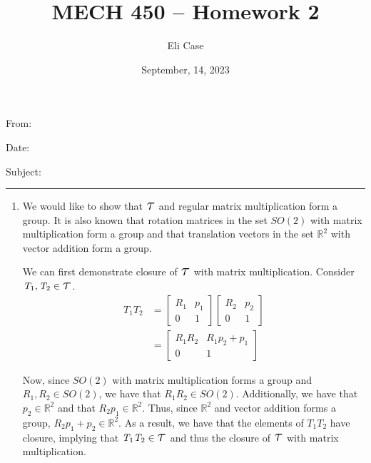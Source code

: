 \documentclass[11pt]{article}
\author{Eli Case}
\title{MECH 450 -- Homework 2}
\date{September, 14, 2023}
\newcommand\Tau{\scalerel*{\tau}{T}}
\begin{document}
\flushleft
\thispagestyle{plain}

From: \@author

Date: \@date

Subject: \@title

\makeatother
\medskip
\hrule
\medskip

\begin{enumerate}[leftmargin=0.3in]

   \item %
   \begin{enumerate}
    We would like to show that $\Tau$ and regular matrix multiplication form a group. It is also known that rotation matrices in the set $\mathit{SO}(2)$ with matrix multiplication form a group and that translation vectors in the set $\mathbb{R}^2$ with vector addition form a group. \break

    We can first demonstrate closure of $\Tau$ with matrix multiplication. Consider $\mathit{T}_1, \mathit{T}_2 \in \Tau$. 
       \begin{align*}
           \mathit{T}_1 \mathit{T}_2 &= \begin{bmatrix}
               \mathit{R}_1 & \mathit{p}_1 \\
               0 & 1
               \end{bmatrix} \begin{bmatrix}
               \mathit{R}_2 & \mathit{p}_2 \\
               0 & 1
           \end{bmatrix} \\
           &= \begin{bmatrix}
              \mathit{R}_1 \mathit{R}_2 & \mathit{R}_1 \mathit{p}_2 + \mathit{p}_1 \\
              0 & 1
          \end{bmatrix}
       \end{align*}

       Now, since $\mathit{SO}(2)$ with matrix multiplication forms a group and $\mathit{R}_1, \mathit{R}_2 \in \mathit{SO}(2)$, we have that $\mathit{R}_1 \mathit{R}_2 \in \mathit{SO}(2)$. Additionally, we have that $\mathit{p}_2 \in \mathbb{R}^2$ and that $\mathit{R}_2 \mathit{p}_1 \in \mathbb{R}^2$. Thus, since $\mathbb{R}^2$ and vector addition forms a group, $\mathit{R}_2 \mathit{p}_1 + \mathit{p}_2 \in \mathbb{R}^2$. As a result, we have that the elements of $\mathit{T}_1 \mathit{T}_2$ have closure, implying that $\mathit{T}_1 \mathit{T}_2 \in \Tau$ and thus the closure of $\Tau$ with matrix multiplication. \break 


\end{enumerate}
\end{enumerate}
\end{document}
